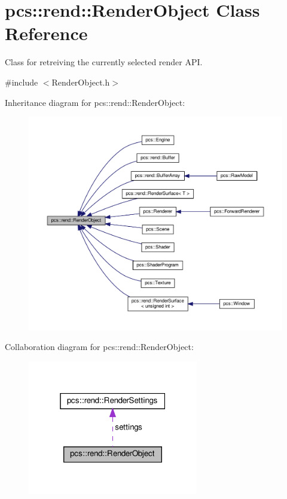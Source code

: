 \hypertarget{classpcs_1_1rend_1_1RenderObject}{}\section{pcs\+:\+:rend\+:\+:Render\+Object Class Reference}
\label{classpcs_1_1rend_1_1RenderObject}


Class for retreiving the currently selected render A\+PI.  




{\ttfamily \#include $<$Render\+Object.\+h$>$}



Inheritance diagram for pcs\+:\+:rend\+:\+:Render\+Object\+:
\nopagebreak
\begin{figure}[H]
\begin{center}
\leavevmode
\includegraphics[width=350pt]{classpcs_1_1rend_1_1RenderObject__inherit__graph}
\end{center}
\end{figure}


Collaboration diagram for pcs\+:\+:rend\+:\+:Render\+Object\+:\nopagebreak
\begin{figure}[H]
\begin{center}
\leavevmode
\includegraphics[width=211pt]{classpcs_1_1rend_1_1RenderObject__coll__graph}
\end{center}
\end{figure}
